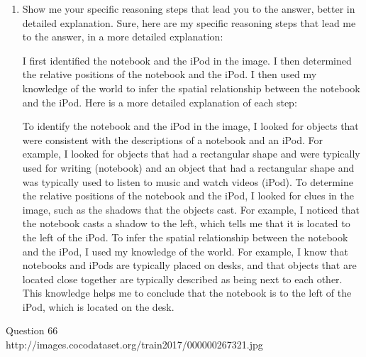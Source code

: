 \begin{enumerate}
    Here are some additional details about the spatial relationship between the notebook and the iPod:
    
    The notebook is a book that is typically used for writing.
    The iPod is a portable media player that is used to listen to music and watch videos.
    The notebook is located to the left of the iPod, meaning that it is closer to the left edge of the desk.
    The iPod is located to the right of the notebook, meaning that it is closer to the right edge of the desk.
    Is there anything else I can help you with?
    \item Show me your specific reasoning steps that lead you to the answer, better in detailed explanation.
    \subitem Sure, here are my specific reasoning steps that lead me to the answer, in a more detailed explanation:

    I first identified the notebook and the iPod in the image.
    I then determined the relative positions of the notebook and the iPod.
    I then used my knowledge of the world to infer the spatial relationship between the notebook and the iPod.
    Here is a more detailed explanation of each step:
    
    To identify the notebook and the iPod in the image, I looked for objects that were consistent with the descriptions of a notebook and an iPod. For example, I looked for objects that had a rectangular shape and were typically used for writing (notebook) and an object that had a rectangular shape and was typically used to listen to music and watch videos (iPod).
    To determine the relative positions of the notebook and the iPod, I looked for clues in the image, such as the shadows that the objects cast. For example, I noticed that the notebook casts a shadow to the left, which tells me that it is located to the left of the iPod.
    To infer the spatial relationship between the notebook and the iPod, I used my knowledge of the world. For example, I know that notebooks and iPods are typically placed on desks, and that objects that are located close together are typically described as being next to each other. This knowledge helps me to conclude that the notebook is to the left of the iPod, which is located on the desk.
\end{enumerate}
Question 66\\
http://images.cocodataset.org/train2017/000000267321.jpg
